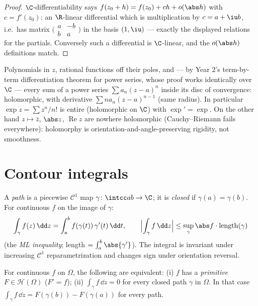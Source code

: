 \begin{proof}
$\C$-differentiability says $f(z_0 + h) = f(z_0) + ch +
o(\abs h)$ with $c = f'(z_0)$: an $\R$-linear differential
which is multiplication by $c = a + \iu b$, i.e.\ has matrix
$\bigl(\begin{smallmatrix} a & -b\\ b & a
\end{smallmatrix}\bigr)$ in the basis $(1, \iu)$ --- exactly
the displayed relations for the partials. Conversely such a
differential is $\C$-linear, and the $o(\abs h)$ definitions
match.
\end{proof}

\begin{example}\label{ex:b3:holomorphic:examples}
Polynomials in $z$, rational functions off their poles, and
--- by Year 2's term-by-term differentiation theorem for power
series, whose proof works identically over $\C$ --- every sum
of a power series $\sum a_n(z - a)^n$ inside its disc of
convergence: holomorphic, with derivative $\sum na_n(z -
a)^{n-1}$ (same radius). In particular $\exp z = \sum z^n/n!$
is entire (holomorphic on $\C$) with $\exp' = \exp$. On the
other hand $z \mapsto \bar z$, $\abs z$, $\operatorname{Re}z$
are nowhere holomorphic (Cauchy--Riemann fails everywhere):
holomorphy is orientation-and-angle-preserving rigidity, not
smoothness.
\end{example}

\section{Contour integrals}

\begin{definition}\label{def:b3:holomorphic:contour}
A \emph{path} is a piecewise $\mathcal C^1$ map $\gamma \colon
\intcc ab \to \C$; it is \emph{closed} if $\gamma(a) =
\gamma(b)$. For continuous $f$ on the image of
$\gamma$:
\[
\int_\gamma f(z)\,\dd z =
\int_a^b f(\gamma(t))\,\gamma'(t)\,\dd t,
\qquad
\Bigl|\int_\gamma f\,\dd z\Bigr| \leq
\sup_{\gamma}\abs f\cdot\operatorname{length}(\gamma)
\]
(the \emph{ML inequality}; length $= \int_a^b\abs{\gamma'}$).
The integral is invariant under increasing $\mathcal C^1$
reparametrization and changes sign under orientation reversal.
\end{definition}

\begin{proposition}[Primitives]\label{prop:b3:holomorphic:primitive}
For continuous $f$ on $\Omega$, the following are equivalent:
(i) $f$ has a \emph{primitive} $F \in \mathcal H(\Omega)$ ($F'
= f$); (ii) $\int_\gamma f\,\dd z = 0$ for every closed path
$\gamma$ in $\Omega$. In that case $\int_\gamma f\,\dd z =
F(\gamma(b)) - F(\gamma(a))$ for every path.
\end{proposition}


